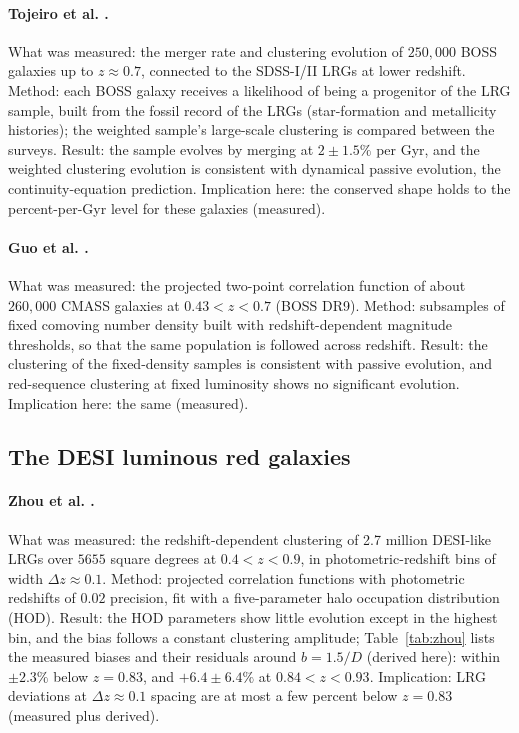 \documentclass[11pt]{article}
\begin{document}
\paragraph{Tojeiro et al. \cite{Tojeiro2012}.}
What was measured: the merger rate and clustering evolution of
$250{,}000$ BOSS galaxies up to $z \approx 0.7$, connected to the
SDSS-I/II LRGs at lower redshift.  Method: each BOSS galaxy receives
a likelihood of being a progenitor of the LRG sample, built from the
fossil record of the LRGs (star-formation and metallicity
histories); the weighted sample's large-scale clustering is compared
between the surveys.  Result: the sample evolves by merging at
$2 \pm 1.5\%$ per Gyr, and the weighted clustering evolution is
consistent with dynamical passive evolution, the continuity-equation
prediction.  Implication here: the conserved shape holds to the
percent-per-Gyr level for these galaxies (measured).

\paragraph{Guo et al. \cite{Guo2013}.}
What was measured: the projected two-point correlation function of
about $260{,}000$ CMASS galaxies at $0.43 < z < 0.7$ (BOSS DR9).
Method: subsamples of fixed comoving number density built with
redshift-dependent magnitude thresholds, so that the same population
is followed across redshift.  Result: the clustering of the
fixed-density samples is consistent with passive evolution, and
red-sequence clustering at fixed luminosity shows no significant
evolution.  Implication here: the same (measured).

\subsection{The DESI luminous red galaxies}

\paragraph{Zhou et al. \cite{Zhou2021}.}
What was measured: the redshift-dependent clustering of 2.7 million
DESI-like LRGs over $5655$ square degrees at $0.4 < z < 0.9$, in
photometric-redshift bins of width $\Delta z \approx 0.1$.  Method:
projected correlation functions with photometric redshifts of
$0.02$ precision, fit with a five-parameter halo occupation
distribution (HOD).  Result: the HOD parameters show little
evolution except in the highest bin, and the bias follows a constant
clustering amplitude; Table~\ref{tab:zhou} lists the measured biases
and their residuals around $b = 1.5/D$ (derived here): within
$\pm 2.3\%$ below $z = 0.83$, and $+6.4 \pm 6.4\%$ at
$0.84 < z < 0.93$.  Implication: LRG deviations at
$\Delta z \approx 0.1$ spacing are at most a few percent below
$z = 0.83$ (measured plus derived).
\end{document}
